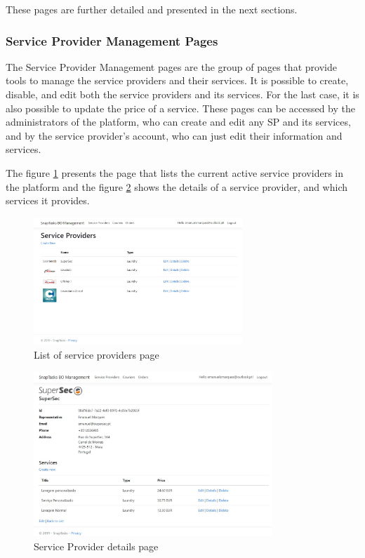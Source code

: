 These pages are further detailed and presented in the next sections.


\subsubsection{Service Provider Management Pages}

The Service Provider Management pages are the group of pages that provide tools to manage the service providers and their services. It is possible to create, disable, and edit both the service providers and its services. For the last case, it is also possible to update the price of a service. These pages can be accessed by the administrators of the platform, who can create and edit any \gls{SP} and its services, and by the service provider's account, who can just edit their information and services. 

\par

The figure \ref{fig:snaptasksSPList} presents the page that lists the current active service providers in the platform and the figure \ref{fig:snaptasksSPDetails} shows the details of a service provider, and which services it provides.

\begin{figure}[!ht]
\centering
\includegraphics[width=0.7\textwidth,keepaspectratio]{chapters/Implementation/assets/snaptasks-bo-listSP.jpg}
\caption[List of service providers page]{List of service providers page}
\label{fig:snaptasksSPList}
\end{figure}

\begin{figure}[!ht]
\centering
\includegraphics[width=0.8\textwidth,keepaspectratio]{chapters/Implementation/assets/snaptasks-bo-detailsSP.jpg}
\caption[Service Provider details page]{Service Provider details page}
\label{fig:snaptasksSPDetails}
\end{figure}



